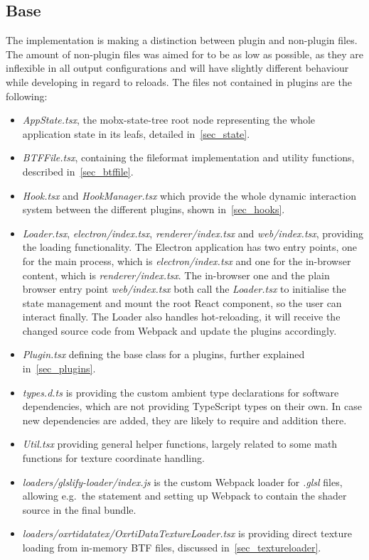 \subsection{Base}
The implementation is making a distinction between plugin and non-plugin files.
The amount of non-plugin files was aimed for to be as low as possible, as they
are inflexible in all output configurations and will have slightly different
behaviour while developing in regard to reloads. The files not contained in
plugins are the following:
\begin{itemize}
\item \emph{AppState.tsx}, the mobx-state-tree root node representing the whole
  application state in its leafs, detailed in~\autoref{sec_state}.
 \item \emph{BTFFile.tsx}, containing the fileformat implementation and utility
   functions, described in~\autoref{sec_btffile}.
\item \emph{Hook.tsx} and \emph{HookManager.tsx} which provide the whole dynamic
  interaction system between the different plugins, shown
  in~\autoref{sec_hooks}.
\item \emph{Loader.tsx}, \emph{electron/index.tsx}, \emph{renderer/index.tsx}
  and \emph{web/index.tsx}, providing the loading functionality. The Electron
  application has two entry points, one for the main process, which is
  \emph{electron/index.tsx} and one for the in-browser content, which is
  \emph{renderer/index.tsx}. The in-browser one and the plain browser entry point
  \emph{web/index.tsx} both call the \emph{Loader.tsx} to initialise the state
  management and mount the root React component, so the user can interact
  finally. The Loader also handles hot-reloading, it will receive the changed
  source code from Webpack and update the plugins accordingly.
 \item \emph{Plugin.tsx} defining the base class for a plugins, further
   explained in~\autoref{sec_plugins}.
\item \emph{types.d.ts} is providing the custom ambient type declarations for
  software dependencies, which are not providing TypeScript types on their own.
  In case new dependencies are added, they are likely to require and addition there.
\item \emph{Util.tsx} providing general helper functions, largely related to
  some math functions for texture coordinate handling.
\item \emph{loaders/glslify-loader/index.js} is the custom Webpack loader for
  \emph{.glsl} files, allowing e.g.\ the  statement and setting up Webpack to contain the shader source
  in the final bundle.
\item \emph{loaders/oxrtidatatex/OxrtiDataTextureLoader.tsx} is providing direct
  texture loading from in-memory BTF files, discussed in~\autoref{sec_textureloader}.
\end{itemize}

